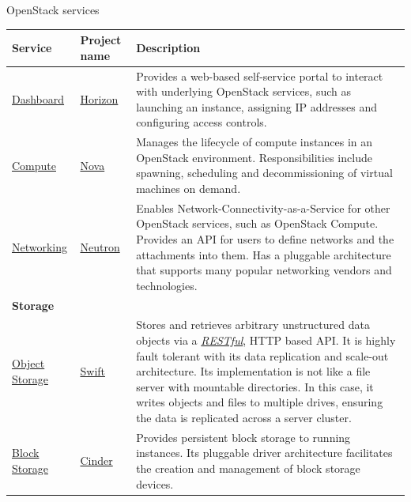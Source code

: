 \documentclass[letterpaper,10pt,english]{sphinxmanual}
\begin{document}
\begin{threeparttable}
\capstart\caption{OpenStack services}

\begin{tabulary}{\linewidth}{|L|L|L|}
\hline
\textsf{\relax 
Service
} & \textsf{\relax 
Project name
} & \textsf{\relax 
Description
}\\
\hline
\href{http://www.openstack.org/software/releases/liberty/components/horizon}{Dashboard}
 & 
\href{http://docs.openstack.org/developer/horizon/}{Horizon}
 & 
Provides a web-based self-service portal
to interact with underlying OpenStack services,
such as launching an instance, assigning IP
addresses and configuring access controls.
\\
\hline
\href{http://www.openstack.org/software/releases/liberty/components/nova}{Compute}
 & 
\href{http://docs.openstack.org/developer/nova/}{Nova}
 & 
Manages the lifecycle of compute instances in an
OpenStack environment. Responsibilities include
spawning, scheduling and decommissioning of virtual
machines on demand.
\\
\hline
\href{http://www.openstack.org/software/releases/liberty/components/neutron}{Networking}
 & 
\href{http://docs.openstack.org/developer/neutron/}{Neutron}
 & 
Enables Network-Connectivity-as-a-Service for
other OpenStack services, such as OpenStack Compute.
Provides an API for users to define networks and the
attachments into them. Has a pluggable architecture
that supports many popular networking vendors and
technologies.
\\
\hline
\textbf{Storage}
 &  & \\
\hline
\href{http://www.openstack.org/software/releases/liberty/components/swift}{Object Storage}
 & 
\href{http://docs.openstack.org/developer/swift/}{Swift}
 & 
Stores and retrieves arbitrary unstructured
data objects via a {\hyperref[_source/glossary:term-restful]{\emph{RESTful}}}, HTTP based API.
It is highly fault tolerant with its data replication and
scale-out architecture. Its implementation is not like a
file server with mountable directories. In this case,
it writes objects and files to multiple drives, ensuring the
data is replicated across a server cluster.
\\
\hline
\href{http://www.openstack.org/software/releases/liberty/components/cinder}{Block Storage}
 & 
\href{http://docs.openstack.org/developer/cinder/}{Cinder}
 & 
Provides persistent block storage to running instances. Its pluggable
driver architecture facilitates the creation and management of
block storage devices.
\\

\end{tabulary}
\end{threeparttable}
\end{document}
